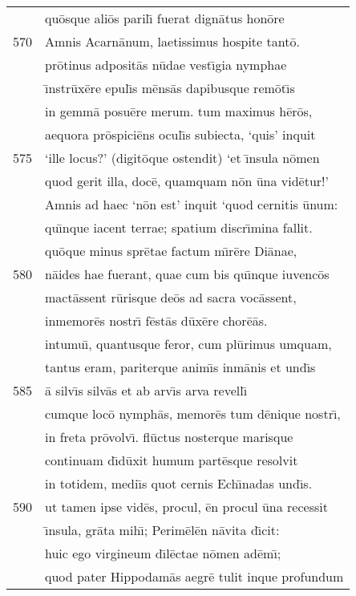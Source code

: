 \documentclass[paper=6in:9in,pagesize=pdftex,
               headinclude=on,footinclude=on,12pt]{scrbook}
\begin{document}
\begin{longtable}[p]{ r l }
 & qu\=osque ali\=os paril\={\i} fuerat dign\=atus hon\=ore\\ 
570 & Amnis Acarn\=anum, laetissimus hospite tant\=o.\\ 
 & pr\=otinus adposit\=as n\=udae vest\={\i}gia nymphae\\ 
 & \={\i}nstr\=ux\=ere epul\={\i}s m\=ens\=as dapibusque rem\=ot\={\i}s\\ 
 & in gemm\=a posu\=ere merum. tum maximus h\=er\=os,\\ 
 & aequora pr\=ospici\=ens ocul\={\i}s subiecta, `quis' inquit\\ 
575 & `ille locus?' (digit\=oque ostendit) `et \={\i}nsula n\=omen\\ 
 & quod gerit illa, doc\=e, quamquam n\=on \=una vid\=etur!'\\ 
 & Amnis ad haec `n\=on est' inquit `quod cernitis \=unum:\\ 
 & qu\={\i}nque iacent terrae; spatium discr\={\i}mina fallit.\\ 
 & qu\=oque minus spr\=etae factum m\={\i}r\=ere Di\=anae,\\ 
580 & n\=aides hae fuerant, quae cum bis qu\={\i}nque iuvenc\=os\\ 
 & mact\=assent r\=urisque de\=os ad sacra voc\=assent,\\ 
 & inmemor\=es nostr\={\i} f\=est\=as d\=ux\=ere chor\=e\=as.\\ 
 & intumu\={\i}, quantusque feror, cum pl\=urimus umquam,\\ 
 & tantus eram, pariterque anim\={\i}s inm\=anis et und\={\i}s\\ 
585 & \=a silv\={\i}s silv\=as et ab arv\={\i}s arva revell\={\i}\\ 
 & cumque loc\=o nymph\=as, memor\=es tum d\=enique nostr\={\i},\\ 
 & in freta pr\=ovolv\={\i}. fl\=uctus nosterque marisque\\ 
 & continuam d\={\i}d\=uxit humum part\=esque resolvit\\ 
 & in totidem, medi\={\i}s quot cernis Ech\={\i}nadas und\={\i}s.\\ 
590 & ut tamen ipse vid\=es, procul, \=en procul \=una recessit\\ 
 & \={\i}nsula, gr\=ata mih\={\i}; Perim\=el\=en n\=avita d\={\i}cit:\\ 
 & huic ego virgineum d\={\i}l\=ectae n\=omen ad\=em\={\i};\\ 
 & quod pater Hippodam\=as aegr\=e tulit inque profundum\\ 

\end{longtable}
\end{document}
